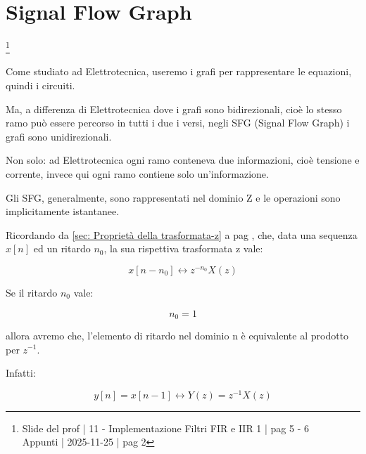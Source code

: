 \newpage  

\section{Signal Flow Graph}

\footnote{ 
    Slide del prof | 11 - Implementazione Filtri FIR e IIR 1 | pag 5 - 6\\
    Appunti | 2025-11-25 | pag 2  
} 

Come studiato ad Elettrotecnica, useremo i grafi per rappresentare le equazioni, quindi i circuiti. \newline 

Ma, a differenza di Elettrotecnica dove i grafi sono bidirezionali, cioè lo stesso ramo può essere percorso in tutti i due i versi, 
negli SFG (Signal Flow Graph) i grafi sono unidirezionali. \newline 

Non solo: ad Elettrotecnica ogni ramo conteneva due informazioni, cioè tensione e corrente, invece qui ogni ramo contiene solo un'informazione. \newline 

Gli SFG, generalmente, sono rappresentati nel dominio Z e le operazioni sono implicitamente istantanee. \newline 


Ricordando da \ref{sec: Proprietà della trasformata-z}  a pag \pageref{sec: Proprietà della trasformata-z}, 
che, data una sequenza $x \left[ n\right]$ ed un ritardo $n_0$, la sua rispettiva trasformata z vale: 

{
    \Large 
    \begin{equation}
        x \left[ n - n_0\right] 
        \leftrightarrow
        z^{- n_0} X \left( z\right)
    \end{equation}
}

Se il ritardo $n_0$ vale: 

{
    \Large 
    \begin{equation}
        n_0 = 1
    \end{equation}
}

allora avremo che, l'elemento di ritardo nel dominio n è equivalente al prodotto per $z^{-1}$. \newline 

Infatti: 

{
    \Large 
    \begin{equation}
        y \left[ n\right] 
        = 
        x \left[ n - 1\right] 
        \leftrightarrow
        Y \left(z\right)
        =
        z^{- 1} X \left( z\right)
    \end{equation}
}

